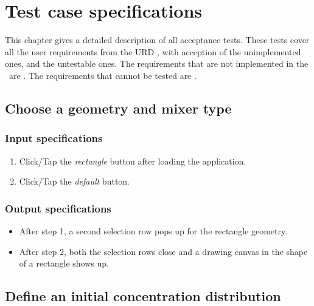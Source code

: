 \chapter{Test case specifications}
\label{chap:testCaseSpecs}
\renewcommand{\atref}[1]{AT\ref{at:#1}}

This chapter gives a detailed description of all acceptance tests. These tests cover all the user requirements from the URD \cite{urd}, with acception of the unimplemented ones, and the untestable ones.
The requirements that are not implemented in the \applicationname\ are .
The requirements that cannot be tested are .

\section{Choose a geometry and mixer type}

\subsection*{Input specifications}
\begin{enumerate}
\item Click/Tap the \emph{rectangle} button after loading the application.
\item Click/Tap the \emph{default} button.
\end{enumerate}

\subsection*{Output specifications}
\begin{itemize}
\item After step 1, a second selection row pops up for the rectangle geometry.
\item After step 2, both the selection rows close and a drawing canvas in the shape of a rectangle shows up.
\end{itemize}
 
\section{Define an initial concentration distribution}

